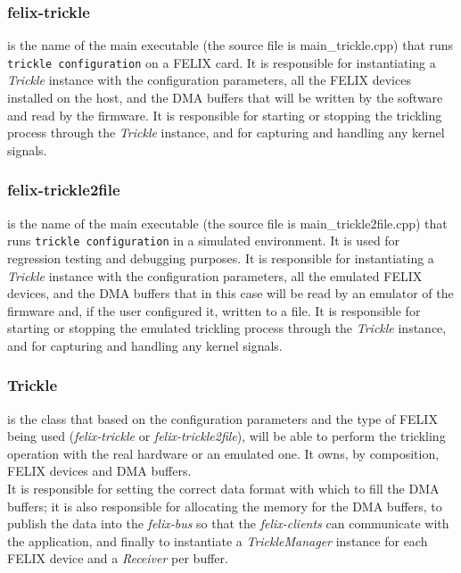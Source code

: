 \subsubsection{felix-trickle} is the name of the main executable (the source file is main\_trickle.cpp) that runs \texttt{trickle\ configuration} on a \acs{FELIX} card. It is responsible for instantiating a \emph{Trickle} instance with the configuration parameters, all the \acs{FELIX} devices installed on the host, and the \acs{DMA} buffers that will be written by the software and read by the firmware. It is responsible for starting or stopping the trickling process through the \emph{Trickle} instance, and for capturing and handling any kernel signals.

\subsubsection{felix-trickle2file} is the name of the main executable (the source file is main\_trickle2file.cpp) that runs \texttt{trickle configuration} in a simulated environment. It is used for regression testing and debugging purposes. It is responsible for instantiating a \emph{Trickle} instance with the configuration parameters, all the emulated \acs{FELIX} devices, and the \acs{DMA} buffers that in this case will be read by an emulator of the firmware and, if the user configured it, written to a file. It is responsible for starting or stopping the emulated trickling process through the \emph{Trickle} instance, and for capturing and handling any kernel signals.

\subsubsection{Trickle} is the class that based on the configuration parameters and the type of \acs{FELIX} being used (\emph{felix-trickle} or \emph{felix-trickle2file}), will be able to perform the trickling operation with the real hardware or an emulated one. It owns, by composition, \acs{FELIX} devices and \acs{DMA} buffers.\\
It is responsible for setting the correct data format with which to fill the \acs{DMA} buffers; it is also responsible for allocating the memory for the \acs{DMA} buffers, to publish the data into the \emph{felix-bus} so that the \emph{felix-clients} can communicate with the application, and finally to instantiate a \emph{TrickleManager} instance for each \acs{FELIX} device and a \emph{Receiver} per buffer.

